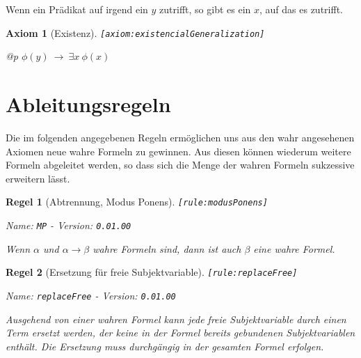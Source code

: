 \documentclass[a4paper,german,10pt,twoside]{book}
\newtheorem{ax}{Axiom}
\newtheorem{rul}{Regel}
\theoremstyle{definition}
\theoremstyle{remark}
\begin{document}
\par
Wenn ein Pr{\"a}dikat auf irgend ein $y$ zutrifft, so gibt es ein $x$, auf das es zutrifft.

\begin{ax}[Existenz]
\label{axiom:existencialGeneralization} \hypertarget{axiom:existencialGeneralization}{}
{\tt \tiny [\verb]axiom:existencialGeneralization]]}
\mbox{}
\begin{longtable}{{@{\extracolsep{\fill}}p{\linewidth}}}
\centering $\phi(y)\ \rightarrow\ \exists x\ \phi(x)$
\end{longtable}

\end{ax}


\section{Ableitungsregeln} \label{chapter5_section2} \hypertarget{chapter5_section2}{}
Die im folgenden angegebenen Regeln erm{\"o}glichen uns aus den wahr angesehenen Axiomen neue wahre Formeln zu gewinnen. Aus diesen k{\"o}nnen wiederum weitere Formeln abgeleitet werden, so dass sich die Menge der wahren Formeln sukzessive erweitern l{\"a}sst.

\begin{rul}[Abtrennung, Modus Ponens]
\label{rule:modusPonens} \hypertarget{rule:modusPonens}{}
{\tt \tiny [\verb]rule:modusPonens]]}

\par
{\em   Name: \verb]MP]  -  Version: \verb]0.01.00]}


Wenn $\alpha$ und $\alpha \rightarrow \beta$ wahre Formeln sind, dann ist auch $\beta$ eine wahre Formel.
\end{rul}


\begin{rul}[Ersetzung f{\"u}r freie Subjektvariable]
\label{rule:replaceFree} \hypertarget{rule:replaceFree}{}
{\tt \tiny [\verb]rule:replaceFree]]}

\par
{\em   Name: \verb]replaceFree]  -  Version: \verb]0.01.00]}


Ausgehend von einer wahren Formel kann jede freie Subjektvariable durch einen Term ersetzt werden, der keine in der Formel bereits gebundenen Subjektvariablen enth{\"a}lt. Die Ersetzung muss durchg{\"a}ngig in der gesamten Formel erfolgen.
\end{rul}
\end{document}

